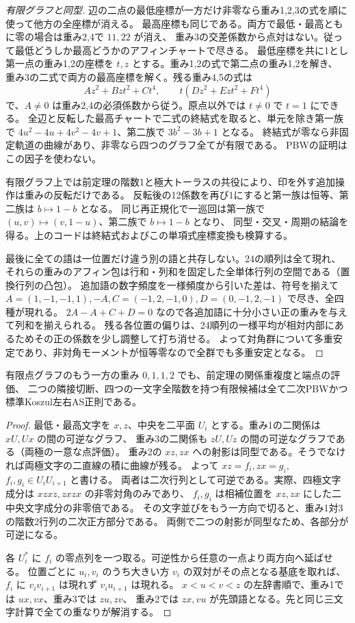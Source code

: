 \begin{proof}[有限グラフと同型]
辺の二点の最低座標が一方だけ非零なら重み1,2,3の式を順に使って他方の全座標が消える。
最高座標も同じである。両方で最低・最高ともに零の場合は重み2,4で $11,22$ が消え、
重み3の交差係数から点対はない。従って最低どうしか最高どうかのアフィンチャートで尽きる。
最低座標を共に1とし第一点の重み1,2の座標を $t,z$ とする。重み1,2の式で第二点の重み1,2を解き、
重み3の二式で両方の最高座標を解く。残る重み4,5の式は
\[
 A z^2+Bzt^2+Ct^4,\qquad t(Dz^2+Ezt^2+Ft^4)
\]
で、$A\ne0$ は重み2,4の必須係数から従う。原点以外では $t\ne0$ で $t=1$ にできる。
全辺と反転した最高チャートで二式の終結式を取ると、単元を除き第一族で
$4u^2-4u+4v^2-4v+1$、第二族で $3b^2-3b+1$ となる。
終結式が零なら非固定軌道の曲線があり、非零なら四つのグラフ全てが有限である。
PBWの証明はこの因子を使わない。

有限グラフ上では前定理の階数1と極大トーラスの共役により、印を外す追加操作は重みの反転だけである。
反転後の12係数を再び1にすると第一族は恒等、第二族は $b\mapsto1-b$ となる。
同じ再正規化で一巡回は第一族で $(u,v)\mapsto(v,1-u)$、第二族で $b\mapsto1-b$ となり、
同型・交叉・周期の結論を得る。上のコードは終結式およびこの単項式座標変換も検算する。

最後に全ての語は一位置だけ違う別の語と共存しない。24の順列は全て現れ、
それらの重みのアフィン包は行和・列和を固定した全単体行列の空間である（置換行列の凸包）。
追加語の数字頻度を一様頻度から引いた差は、符号を揃えて
$A=(1,-1,-1,1),-A,C=(-1,2,-1,0),D=(0,-1,2,-1)$ で尽き、全四種が現れる。
$2A-A+C+D=0$ なので各追加語に十分小さい正の重みを与えて列和を揃えられる。
残る各位置の偏りは、24順列の一様平均が相対内部にあるためその正の係数を少し調整して打ち消せる。
よって対角群について多重安定であり、非対角モーメントが恒等零なので全群でも多重安定となる。
\end{proof}

\begin{proposition}\label{prop:double-middle-finite-pbw}
有限点グラフのもう一方の重み $0,1,1,2$ でも、前定理の関係重複度と端点の評価、
二つの隣接切断、四つの一文字全階数を持つ有限候補は全て二次PBWかつ標準Koszul左右AS正則である。
\end{proposition}
\begin{proof}
最低・最高文字を $x,z$、中央を二平面 $U_i$ とする。重み1の二関係は $xU,Ux$ の間の可逆なグラフ、
重み3の二関係も $zU,Uz$ の間の可逆なグラフである（両極の一意な点評価）。
重み2の $xz,zx$ への射影は同型である。そうでなければ両極文字の二直線の積に曲線が残る。
よって $xz=f_i, zx=g_i$, $f_i,g_i\in U_i U_{i+1}$ と書ける。
両者は二次行列として可逆である。実際、四極文字成分は $xzxz,zxzx$ の非零対角のみであり、
$f_i,g_i$ は相補位置を $xz,zx$ にした二中央文字成分の非零倍である。
その文字並びをもう一方向で切ると、重み1対3の階数2行列の二次正方部分である。
両側で二つの射影が同型なため、各部分が可逆になる。

各 $U_i^*$ に $f_i$ の零点列を一つ取る。可逆性から任意の一点より両方向へ延ばせる。
位置ごとに $u_i,v_i$ のうち大きい方 $v_i$ の双対がその点となる基底を取れば、
$f_i$ に $v_i v_{i+1}$ は現れず $v_i u_{i+1}$ は現れる。
$x<u<v<z$ の左辞書順で、重み1では $ux,vx$、重み3では $zu,zv$、
重み2では $zx,vu$ が先頭語となる。先と同じ三文字計算で全ての重なりが解消する。
\end{proof}
